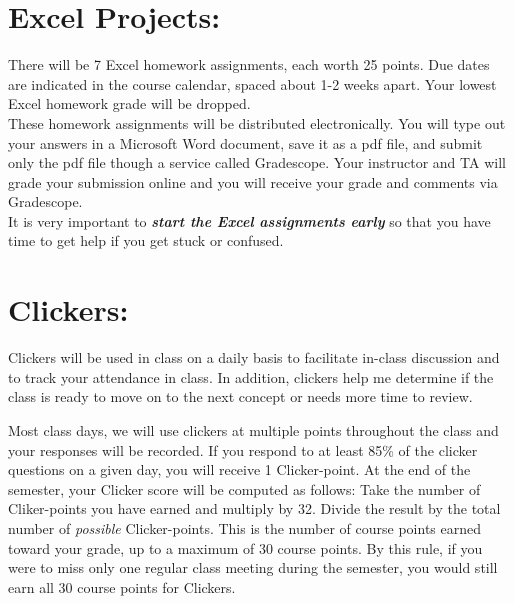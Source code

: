 \documentclass[11pt]{article}
\begin{document}
\vspace{0.5cm}


\section{\textbf{Excel Projects:}}
\vspace{-.65cm}
\hangindent=5cm 
There will be 7 Excel homework assignments, each worth 25 points.
Due dates are indicated in the course calendar, spaced about 1-2 weeks apart.
Your lowest Excel homework grade will be dropped.\\

\hangindent=5cm 
These homework assignments will be distributed electronically.
You will type out your answers in a Microsoft Word document, save it as a pdf file, and submit only the pdf file though a service called Gradescope.
Your instructor and TA will grade your submission online and you will receive your grade and comments via Gradescope.\\

\hangindent=5cm 
It is very important to \textbf{\textit{start the Excel assignments early}} so that you have time to get help if you get stuck or confused.

\vspace{0.5cm}


\section{\textbf{Clickers:}}
\vspace{-.65cm}
\hangindent=5cm 
Clickers will be used in class on a daily basis to facilitate in-class discussion and to track your attendance in class.
In addition, clickers help me determine if the class is ready to move on to the next concept or needs more time to review.

\hangindent=5cm 
Most class days, we will use clickers at multiple points throughout the class and your responses will be recorded.
If you respond to at least 85\% of the clicker questions on a given day, you will receive 1 Clicker-point.
At the end of the semester, your Clicker score will be computed as follows:  Take the number of Cliker-points you have earned and multiply by 32.  Divide the result by the total number of \textit{possible} Clicker-points.  This is the number of course points earned toward your grade, up to a maximum of 30 course points.
By this rule, if you were to miss only one regular class meeting during the semester, you would still earn all 30 course points for Clickers.
\end{document}
